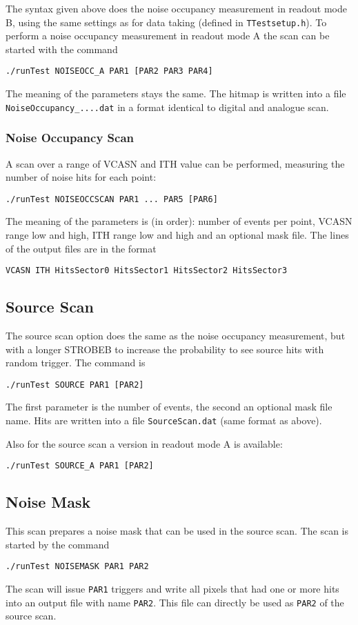 \documentclass{article}
\begin{document}
The syntax given above does the noise occupancy measurement in readout
mode B, using the same settings as for data taking (defined in
\texttt{TTestsetup.h}). To perform a noise occupancy measurement in
readout mode A the scan can be started with the command 
\begin{verbatim}
./runTest NOISEOCC_A PAR1 [PAR2 PAR3 PAR4]
\end{verbatim}

The meaning of the parameters stays the same. 
The hitmap is written into a file \texttt{NoiseOccupancy\_....dat} in a
format identical to digital and analogue scan. 

\subsubsection{Noise Occupancy Scan}
A scan over a range of VCASN and ITH value can be performed, measuring
the number of noise hits for each point:

\begin{verbatim}
./runTest NOISEOCCSCAN PAR1 ... PAR5 [PAR6]
\end{verbatim}

The meaning of the parameters is (in order): number of events per
point, VCASN range low and high, ITH range low and high and an
optional mask file. The lines of the output files are in the format 
\begin{verbatim}
VCASN ITH HitsSector0 HitsSector1 HitsSector2 HitsSector3
\end{verbatim}

\subsection{Source Scan}
The source scan option does the same as the noise occupancy
measurement, but with a longer STROBEB to increase the probability to
see source hits with random trigger. The command is 
\begin{verbatim}
./runTest SOURCE PAR1 [PAR2]
\end{verbatim}
The first parameter is the number of events, the second an optional
mask file name. Hits are written into a file \texttt{SourceScan.dat}
(same format as above).

Also for the source scan a version in readout mode A is available:
\begin{verbatim}
./runTest SOURCE_A PAR1 [PAR2]
\end{verbatim}

\subsection{Noise Mask}
This scan prepares a noise mask that can be used in the source
scan. The scan is started by the command
\begin{verbatim}
./runTest NOISEMASK PAR1 PAR2
\end{verbatim}
The scan will issue \texttt{PAR1} triggers and write all pixels that
had one or more hits into an output file with name \texttt{PAR2}. This
file can directly be used as \texttt{PAR2} of the source scan.
\end{document}
